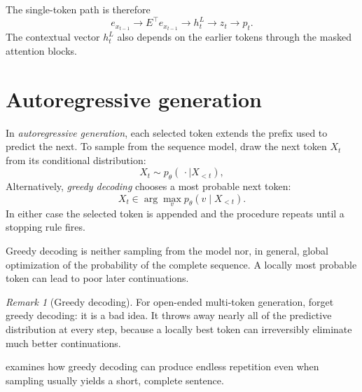 \documentclass[11pt,twoside]{article}
\theoremstyle{plain}
\theoremstyle{definition}
\theoremstyle{remark}
\newtheorem{remark}{Remark}[section]
\begin{document}
The single-token path is therefore
\begin{equation}
e_{x_{t-1}}
\longrightarrow E^\top e_{x_{t-1}}
\longrightarrow h_t^L
\longrightarrow z_t
\longrightarrow p_t.
\end{equation}
The contextual vector $h_t^L$ also depends on the earlier tokens through the
masked attention blocks.

\section{Autoregressive generation}

In \emph{autoregressive generation}, each selected token extends the prefix
used to predict the next. To sample from the sequence model, draw the next
token $X_t$ from its conditional distribution:
\begin{equation}
X_t\sim p_\theta(\,\cdot\mid X_{<t}),
\end{equation}
Alternatively, \emph{greedy decoding} chooses a most probable next token:
\begin{equation}
X_t\in\arg\max_v p_\theta(v\mid X_{<t}).
\end{equation}
In either case the selected token is appended and the procedure repeats until
a stopping rule fires.

Greedy decoding is neither sampling from the model nor, in general, global
optimization of the probability of the complete sequence. A locally most
probable token can lead to poor later continuations.

\begin{remark}[Greedy decoding]
\label{rem:greedy-decoding}
For open-ended multi-token generation, forget greedy decoding:
it is a bad idea. It throws away nearly all of the predictive distribution at
every step, because a locally best token can irreversibly eliminate much better
continuations.

 examines how greedy decoding can produce endless
repetition even when sampling usually yields a short, complete sentence.
\end{remark}
\end{document}
